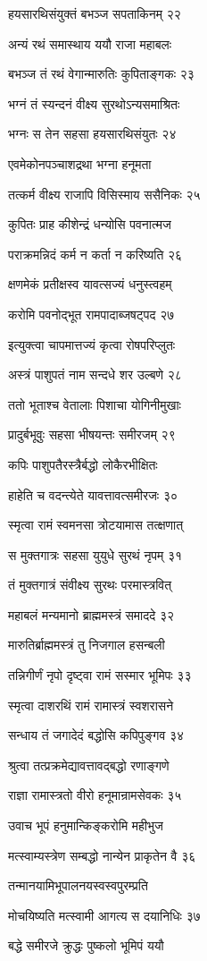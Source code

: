 हयसारथिसंयुक्तं बभञ्ज सपताकिनम् २२

अन्यं रथं समास्थाय ययौ राजा महाबलः

बभञ्ज तं रथं वेगान्मारुतिः कुपिताङ्गकः २३

भग्नं तं स्यन्दनं वीक्ष्य सुरथोऽन्यसमाश्रितः

भग्नः स तेन सहसा हयसारथिसंयुतः २४

एवमेकोनपञ्चाशद्रथा भग्ना हनूमता

तत्कर्म वीक्ष्य राजापि विसिस्माय ससैनिकः २५

कुपितः प्राह कीशेन्द्रं धन्योसि पवनात्मज

पराक्रमन्निदं कर्म न कर्ता न करिष्यति २६

क्षणमेकं प्रतीक्षस्व यावत्सज्यं धनुस्त्वहम्

करोमि पवनोद्भूत रामपादाब्जषट्पद २७

इत्युक्त्वा चापमात्तज्यं कृत्वा रोषपरिप्लुतः

अस्त्रं पाशुपतं नाम सन्दधे शर उल्बणे २८

ततो भूताश्च वेतालाः पिशाचा योगिनीमुखाः

प्रादुर्बभूवुः सहसा भीषयन्तः समीरजम् २९

कपिः पाशुपतैरस्त्रैर्बद्धो लोकैरभीक्षितः

हाहेति च वदन्त्येते यावत्तावत्समीरजः ३०

स्मृत्वा रामं स्वमनसा त्रोटयामास तत्क्षणात्

स मुक्तगात्रः सहसा युयुधे सुरथं नृपम् ३१

तं मुक्तगात्रं संवीक्ष्य सुरथः परमास्त्रवित्

महाबलं मन्यमानो ब्राह्ममस्त्रं समाददे ३२

मारुतिर्ब्राह्ममस्त्रं तु निजगाल हसन्बली

तन्निगीर्णं नृपो दृष्ट्वा रामं सस्मार भूमिपः ३३

स्मृत्वा दाशरथिं रामं रामास्त्रं स्वशरासने

सन्धाय तं जगादेदं बद्धोसि कपिपुङ्गव ३४

श्रुत्वा तत्प्रक्रमेद्यावत्तावद्बद्धो रणाङ्गणे

राज्ञा रामास्त्रतो वीरो हनूमान्रामसेवकः ३५

उवाच भूपं हनुमान्किङ्करोमि महीभुज

मत्स्वाम्यस्त्रेण सम्बद्धो नान्येन प्राकृतेन वै ३६

तन्मानयामिभूपालनयस्वस्वपुरम्प्रति

मोचयिष्यति मत्स्वामी आगत्य स दयानिधिः ३७

बद्धे समीरजे क्रुद्धः पुष्कलो भूमिपं ययौ

